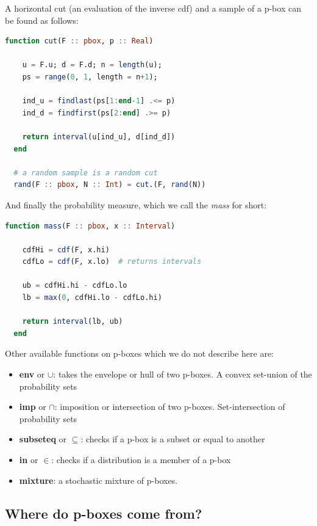 \documentclass{juliacon}
\begin{document}
A horizontal cut (an evaluation of the inverse cdf) and a sample of a p-box can be found as follows: 

\begin{lstlisting}[language = Julia]
  function cut(F :: pbox, p :: Real)

    u = F.u; d = F.d; n = length(u);
    ps = range(0, 1, length = n+1);

    ind_u = findlast(ps[1:end-1] .<= p)
    ind_d = findfirst(ps[2:end] .>= p)
    
    return interval(u[ind_u], d[ind_d])
  end

  # a random sample is a random cut
  rand(F :: pbox, N :: Int) = cut.(F, rand(N))

\end{lstlisting}

And finally the probability measure, which we call the \textit{mass} for short:

\begin{lstlisting}[language = Julia]
  function mass(F :: pbox, x :: Interval)

    cdfHi = cdf(F, x.hi)  
    cdfLo = cdf(F, x.lo)  # returns intervals

    ub = cdfHi.hi - cdfLo.lo
    lb = max(0, cdfHi.lo - cdfLo.hi)

    return interval(lb, ub)
  end

\end{lstlisting}

Other available functions on p-boxes which we do not describe here are:

\begin{itemize}
  \item \textbf{env} or $\cup$: takes the envelope or hull of two p-boxes. A convex set-union of the probability sets
  \item \textbf{imp} or $\cap$: imposition or intersection of two p-boxes. Set-intersection of probability sets
  \item \textbf{subseteq} or $\subseteq$: checks if a p-box is a subset or equal to another
  \item \textbf{in} or $\in$: checks if a distribution is a member of a p-box
  \item \textbf{mixture}: a stochastic mixture of p-boxes.
\end{itemize}

\subsection{Where do p-boxes come from?}
\end{document}

